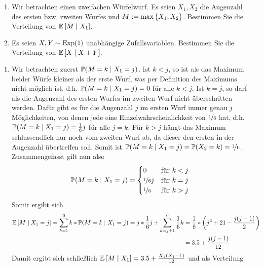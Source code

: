 \begin{exercisePage}
	\begin{homework}
		\begin{enumerate}[wide, leftmargin=*, nolistsep]
			\item Wir betrachten einen zweifachen Würfelwurf. Es seien $X_1, X_2$ die Augenzahl des ersten bzw. zweiten Wurfes und $M \defeq \max \menge{X_1 , X_2}$. Bestimmen Sie die Verteilung von $\EW[M \mid X_1]$.
			\item Es seien $X,Y \sim \Exp(1)$ unabhängige Zufallsvariablen. Bestimmen Sie die Verteilung von $\EW[X \mid X + Y]$.
		\end{enumerate}
	\end{homework}

	\begin{enumerate}[wide, leftmargin=*, label=(zu \alph*)]
		\item Wir betrachten zuerst $\P(M = k \mid X_1 = j)$. Ist $k < j$, so ist als das Maximum beider Würfe kleiner als der erste Wurf, was per Definition des Maximums nicht möglich ist, d.h. $\P(M = k \mid X_1 = j) = 0$ für alle $k < j$. Ist $k = j$, so darf als die Augenzahl des ersten Wurfes im zweiten Wurf nicht überschritten werden. Dafür gibt es für die Augenzahl $j$ im ersten Wurf immer genau $j$ Möglichkeiten, von denen jede eine Einzelwahrscheinlichkeit von $\lfrac{1}{6}$ hat, d.h. $\P(M = k \mid X_1 = j) = \frac{1}{6}j$ für alle $j = k$. Für $k > j$ hängt das Maximum schlussendlich nur noch vom zweiten Wurf ab, da dieser den ersten in der Augenzahl übertreffen soll. Somit ist $\P(M = k \mid X_1 = j) = \P(X_2 = k) = \lfrac{1}{6}$. Zusammengefasst gilt nun also
		\begin{equation*}
			\P(M = k \mid X_1 = j) = 
			\begin{cases}
				0              & \text{für } k < j \\
				\lfrac{1}{6} j & \text{für } k = j \\
				\lfrac{1}{6}   & \text{für } k > j
			\end{cases}
		\end{equation*}
		Somit ergibt sich 
		\begin{equation*}
		\begin{aligned}
			\EW[M \mid X_1 = j] 
			= \sum_{k=1}^{6} k * \P(M = k \mid X_1 = j) 
			= j * \frac{1}{6} j + \sum_{k=j+1}^{6} \frac{1}{6}k
			&= \frac{1}{6} * \left( j^2 + 21 - \frac{j (j-1)}{2} \right) \\
			&= 3.5 + \frac{j (j-1)}{12}
		\end{aligned}
		\end{equation*}
		Damit ergibt sich schließlich $\EW[M \mid X_1] = 3.5 + \frac{X_1 (X_1 - 1)}{12}$ und als Verteilung
		

\end{enumerate}
\end{exercisePage}
